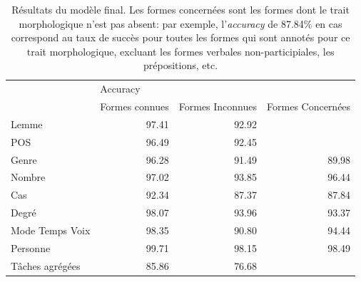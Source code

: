 \begin{table}[ht]
    \begin{tabular}{l|rrr}
    \toprule
                    & \multicolumn{3}{l}{Accuracy}                           \\
                    & Formes connues & Formes Inconnues &  Formes Concernées \\ \midrule
    Lemme           & 97.41          & 92.92            &                    \\
    POS             & 96.49          & 92.45            &                    \\
    Genre           & 96.28          & 91.49            &   89.98            \\
    Nombre          & 97.02          & 93.85            &   96.44            \\
    Cas             & 92.34          & 87.37            &   87.84            \\
    Degré           & 98.07          & 93.96            &   93.37            \\
    Mode Temps Voix & 98.35          & 90.80            &   94.44            \\
    Personne        & 99.71          & 98.15            &   98.49            \\ \midrule
    Tâches agrégées & 85.86          & 76.68            &                    \\ \bottomrule 
    \end{tabular}
    \caption{Résultats du modèle final. Les formes concernées sont les formes dont le trait morphologique n'est pas absent: par exemple, l'\textit{accuracy} de 87.84\% en cas correspond au taux de succès pour toutes les formes qui sont annotés pour ce trait morphologique, excluant les formes verbales non-participiales, les prépositions, etc.}
    \label{tab:modelFinalLemmatisation}
\end{table}

